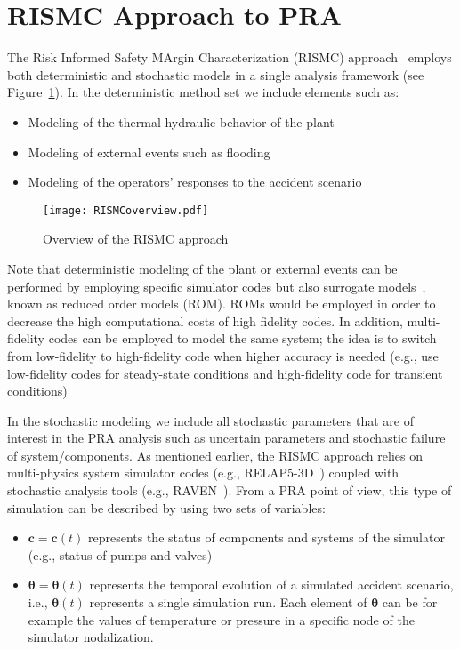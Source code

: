 \section{RISMC Approach to PRA}
\label{sec:rismc}

The Risk Informed Safety MArgin Characterization (RISMC) approach~\cite{RISMC} employs both deterministic and stochastic models 
in a single analysis framework (see Figure~\ref{fig:RISMCoverview}). In the deterministic method 
set we include elements such as:
\begin{itemize}
  \item Modeling of the thermal-hydraulic behavior of the plant~\cite{BWR_SBO_Mandelli,BWRanalysis}
  \item Modeling of external events such as flooding~\cite{mandelliPSA2015}
  \item Modeling of the operators’ responses to the accident scenario~\cite{HRA_BoringReport2014}
\end{itemize}

\begin{figure}
    \centering
    \centerline{\texttt{[image: RISMCoverview.pdf]}}
    \caption{Overview of the RISMC approach}
    \label{fig:RISMCoverview}
\end{figure}

Note that deterministic modeling of the plant or external events can be performed by employing specific 
simulator codes but also surrogate models~\cite{ROM_Khalik}, known as reduced order models (ROM). ROMs would 
be employed 
in order to decrease the high computational costs of high fidelity codes. In addition, multi-fidelity codes 
can be employed to model the same system; the idea is to switch from low-fidelity to high-fidelity code 
when higher accuracy is needed (e.g., use low-fidelity codes for steady-state conditions and high-fidelity 
code for transient conditions)

In the stochastic modeling we include all stochastic parameters that are of interest in the PRA analysis 
such as uncertain parameters and stochastic failure of system/components.
As mentioned earlier, the RISMC approach relies on multi-physics system simulator codes 
(e.g., RELAP5-3D~\cite{relap5}) coupled with stochastic analysis tools (e.g., RAVEN~\cite{alfonsiEsrel2014}).  
From a PRA point of view, this type of simulation can be described by using two sets of variables:
\begin{itemize}
  \item $\boldsymbol c = \boldsymbol c(t)$ represents the status of components and systems of the simulator 
        (e.g., status of pumps and valves)
  \item $\boldsymbol \theta = \boldsymbol \theta (t)$ represents the temporal evolution of a simulated 
        accident scenario, i.e., $\boldsymbol \theta (t)$ represents a single simulation run. 
        Each element of $\boldsymbol \theta$ can be for example the values of temperature or pressure in 
        a specific node of the simulator nodalization.
\end{itemize}

